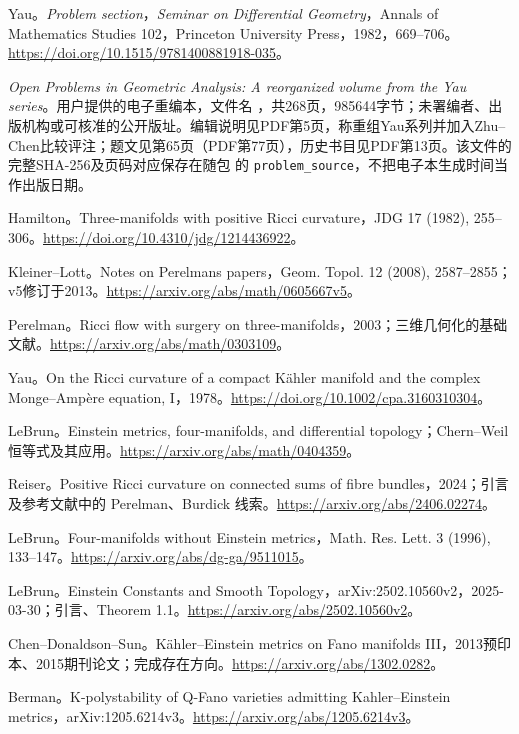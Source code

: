 \documentclass[11pt,a4paper]{article}
\theoremstyle{definition}
\begin{document}
\begin{enumerate}[label={[\arabic*]},leftmargin=2.2em,itemsep=0.55em]
\raggedright
\item Yau。\emph{Problem section}，\emph{Seminar on Differential Geometry}，Annals of Mathematics Studies 102，Princeton University Press，1982，669--706。\url{https://doi.org/10.1515/9781400881918-035}。
\item \emph{Open Problems in Geometric Analysis: A reorganized volume from the Yau series}。用户提供的电子重编本，文件名 ，共268页，985644字节；未署编者、出版机构或可核准的公开版址。编辑说明见PDF第5页，称重组Yau系列并加入Zhu--Chen比较评注；题文见第65页（PDF第77页），历史书目见PDF第13页。该文件的完整SHA-256及页码对应保存在随包  的 \texttt{problem\_source}，不把电子本生成时间当作出版日期。
\item Hamilton。Three-manifolds with positive Ricci curvature，JDG 17 (1982), 255--306。\url{https://doi.org/10.4310/jdg/1214436922}。
\item Kleiner--Lott。Notes on Perelman\textquotesingle s papers，Geom. Topol. 12 (2008), 2587--2855；v5修订于2013。\url{https://arxiv.org/abs/math/0605667v5}。
\item Perelman。Ricci flow with surgery on three-manifolds，2003；三维几何化的基础文献。\url{https://arxiv.org/abs/math/0303109}。
\item Yau。On the Ricci curvature of a compact Kähler manifold and the complex Monge--Ampère equation, I，1978。\url{https://doi.org/10.1002/cpa.3160310304}。
\item LeBrun。Einstein metrics, four-manifolds, and differential topology；Chern--Weil 恒等式及其应用。\url{https://arxiv.org/abs/math/0404359}。
\item Reiser。Positive Ricci curvature on connected sums of fibre bundles，2024；引言及参考文献中的 Perelman、Burdick 线索。\url{https://arxiv.org/abs/2406.02274}。
\item LeBrun。Four-manifolds without Einstein metrics，Math. Res. Lett. 3 (1996), 133--147。\url{https://arxiv.org/abs/dg-ga/9511015}。
\item LeBrun。Einstein Constants and Smooth Topology，arXiv:2502.10560v2，2025-03-30；引言、Theorem 1.1。\url{https://arxiv.org/abs/2502.10560v2}。
\item Chen--Donaldson--Sun。Kähler--Einstein metrics on Fano manifolds III，2013预印本、2015期刊论文；完成存在方向。\url{https://arxiv.org/abs/1302.0282}。
\item Berman。K-polystability of Q-Fano varieties admitting Kahler--Einstein metrics，arXiv:1205.6214v3。\url{https://arxiv.org/abs/1205.6214v3}。

\end{enumerate}
\end{document}
